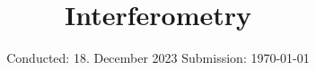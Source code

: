 

\subject{V64}
\title{Interferometry}
\date{%
  Conducted: 18. December 2023
  \hspace{3em}
  Submission: \today
}



\maketitle
\thispagestyle{empty}
\tableofcontents
\newpage








\printbibliography{}
%


